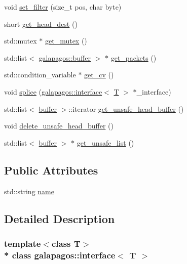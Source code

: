 \begin{DoxyCompactItemize}
void \hyperlink{classgalapagos_1_1interface_a087c18c30205c94e6bc458e5bf99f7e6}{set\+\_\+filter} (size\+\_\+t pos, char byte)
\item 
short \hyperlink{classgalapagos_1_1interface_ac39b859a468e02a0e6b6ca50f042f79d}{get\+\_\+head\+\_\+dest} ()
\item 
std\+::mutex $\ast$ \hyperlink{classgalapagos_1_1interface_a334efdcb21695a5eef218c3a85fbfecd}{get\+\_\+mutex} ()
\item 
std\+::list$<$ \hyperlink{structgalapagos_1_1buffer}{galapagos\+::buffer} $>$ $\ast$ \hyperlink{classgalapagos_1_1interface_a9becb63ba4b22e0b9454f779acb98831}{get\+\_\+packets} ()
\item 
std\+::condition\+\_\+variable $\ast$ \hyperlink{classgalapagos_1_1interface_a4be570f46f0b8e1033e1ad9fcb6dbebb}{get\+\_\+cv} ()
\item 
void \hyperlink{classgalapagos_1_1interface_a5997a6189db1f967df01d0a9fb9e1990}{splice} (\hyperlink{classgalapagos_1_1interface}{galapagos\+::interface}$<$ \hyperlink{test_8cpp_a0658ceffa730c765d449bb3d21871b5f}{T} $>$ $\ast$\+\_\+interface)
\item 
std\+::list$<$ \hyperlink{structgalapagos_1_1buffer}{buffer} $>$\+::iterator \hyperlink{classgalapagos_1_1interface_ab828fd748b635db64e13198d328fae79}{get\+\_\+unsafe\+\_\+head\+\_\+buffer} ()
\item 
void \hyperlink{classgalapagos_1_1interface_a5002553bd7196789fac8adcd8d837f42}{delete\+\_\+unsafe\+\_\+head\+\_\+buffer} ()
\item 
std\+::list$<$ \hyperlink{structgalapagos_1_1buffer}{buffer} $>$ $\ast$ \hyperlink{classgalapagos_1_1interface_ae6f7ed4a44a09ea0871e83a2d508fa13}{get\+\_\+unsafe\+\_\+list} ()
\end{DoxyCompactItemize}
\subsection*{Public Attributes}
\begin{DoxyCompactItemize}
\item 
std\+::string \hyperlink{classgalapagos_1_1interface_a5c9e7d1a9830311b74acd055ccd5f3f6}{name}
\end{DoxyCompactItemize}


\subsection{Detailed Description}
\subsubsection*{template$<$class T$>$\\*
class galapagos\+::interface$<$ T $>$}

